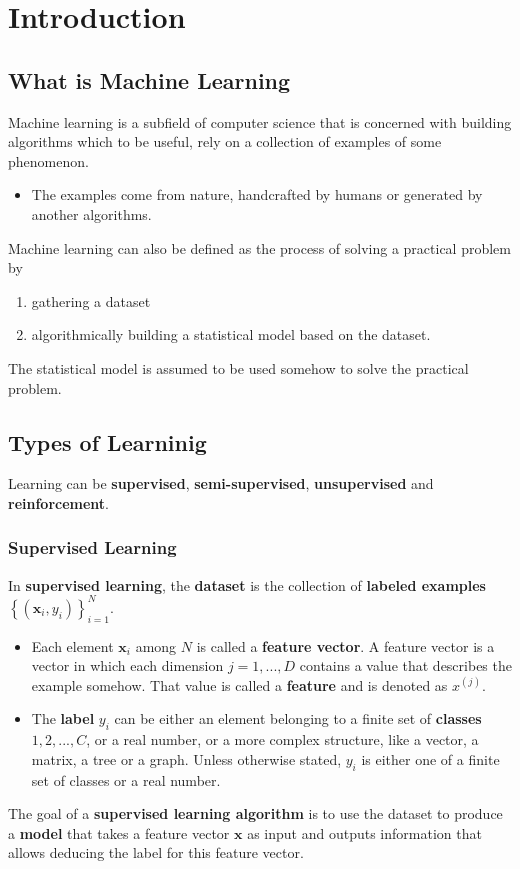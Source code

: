 \chapter{Introduction}
\section{What is Machine Learning}
Machine learning is a subfield of computer science that is concerned with building algorithms which to be useful, rely on a collection of examples of some phenomenon.
\begin{itemize}
	\item The examples come from nature, handcrafted by humans or generated by another algorithms.
\end{itemize}
Machine learning can also be defined as the process of solving a practical problem by
\begin{enumerate}
	\item gathering a dataset
	\item algorithmically building a statistical model based on the dataset.
\end{enumerate}
The statistical model is assumed to be used somehow to solve the practical problem.
\section{Types of Learninig}
Learning can be \textbf{supervised}, \textbf{semi-supervised}, \textbf{unsupervised} and \textbf{reinforcement}.
\subsection{Supervised Learning}
In \textbf{supervised learning}, the \textbf{dataset} is the collection of \textbf{labeled examples} $\left\{\left(\mathbf{x}_i, y_i\right)\right\}_{i=1}^N$.
\begin{itemize}
	\item Each element $\mathbf{x}_i$ among $N$ is called a \textbf{feature vector}. A feature vector is a vector in which each dimension $j=1,...,D$ contains a value that describes the example somehow. That value is called a \textbf{feature} and is denoted as \(x^{(j)}\).
	\item The \textbf{label} \(y_i\) can be either an element belonging to a finite set of \textbf{classes} ${1,2,...,C}$, or a real number, or a more complex structure, like a vector, a matrix, a tree or a graph. Unless otherwise stated, $y_i$ is either one of a finite set of classes or a real number.
\end{itemize}
The goal of a \textbf{supervised learning algorithm} is to use the dataset to produce a \textbf{model} that takes a feature vector $\mathbf{x}$ as input and outputs information that allows deducing the label for this feature vector.

